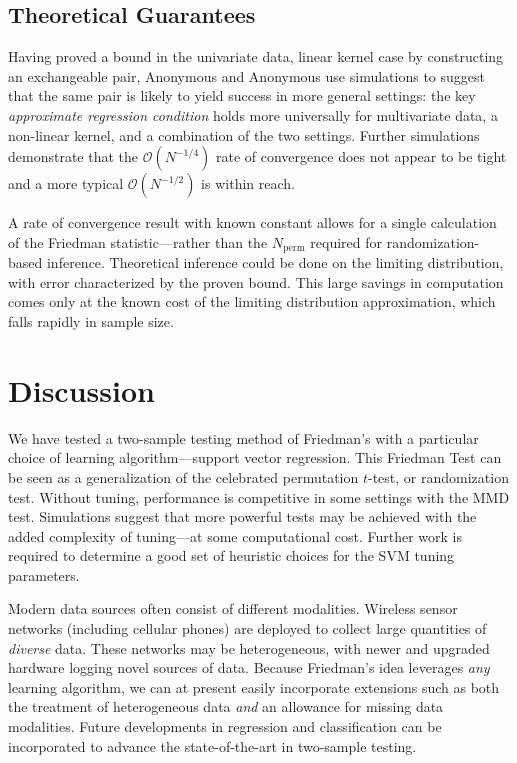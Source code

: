\subsection{Theoretical Guarantees}
Having proved a bound in the univariate data, linear kernel case by
constructing an exchangeable pair, Anonymous and Anonymous
\cite{rayholmes2012} use simulations to suggest
that the same pair is likely to yield success in more general
settings: the key \emph{approximate regression condition} holds more
universally for multivariate data, a non-linear kernel, and a
combination of the two settings.  Further simulations demonstrate that
the $\mathcal{O}(N^{-1/4})$ rate of convergence does not appear to be
tight and a more typical $\mathcal{O}(N^{-1/2})$ is within reach.  

A rate of convergence result with known constant allows
for a single calculation of the Friedman statistic---rather than the
$N_{\mathrm{perm}}$ required for randomization-based inference.
Theoretical inference could be done on the limiting distribution, with
error characterized by the proven bound.  This large savings in
computation comes only at the known cost of the limiting distribution
approximation, which falls rapidly in sample size.

\section{Discussion}
We have tested a two-sample testing method of Friedman's
\cite{friedman30908multivariate} with a particular choice of learning
algorithm---support vector regression.  This Friedman Test can be seen
as a generalization of the celebrated permutation $t$-test, or
randomization test.  Without tuning, performance is competitive in
some settings with the MMD test.  Simulations suggest that more
powerful tests may be achieved with the added complexity of
tuning---at some computational cost.  Further work is required to
determine a good set of heuristic choices for the SVM tuning parameters.

Modern data sources often consist of different modalities.  Wireless
sensor networks (including cellular phones) are deployed to collect
large quantities of \emph{diverse} data.  These networks may be
heterogeneous, with newer and upgraded hardware logging novel sources
of data.  Because Friedman's idea leverages \emph{any} learning algorithm, we
can at present easily incorporate extensions such as both the treatment of
heterogeneous data \emph{and} an allowance for missing data
modalities.  Future developments in regression and classification can
be incorporated to advance the state-of-the-art in two-sample testing.
